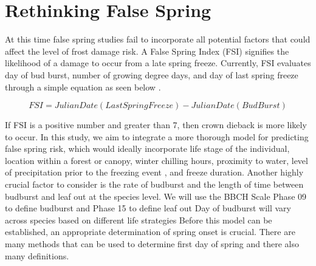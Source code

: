 \documentclass{article}\usepackage[]{graphicx}\usepackage[]{color}
\begin{document}
\section*{Rethinking False Spring}
At this time false spring studies fail to incorporate all potential factors that could affect the level of frost damage risk. A False Spring Index (FSI) signifies the likelihood of a damage to occur from a late spring freeze. Currently, FSI evaluates day of bud burst, number of growing degree days, and day of last spring freeze through a simple equation as seen below \citep{Marino2011}. 

\[ FSI = Julian Date (Last Spring Freeze) - Julian Date (Bud Burst) \]

If FSI is a positive number and greater than 7, then crown dieback is more likely to occur. In this study, we aim to integrate a more thorough model for predicting false spring risk, which would ideally incorporate life stage of the individual, location within a forest or canopy, winter chilling hours, proximity to water, level of precipitation prior to the freezing event \citep{Anderegg2013}
, and freeze duration. Another highly crucial factor to consider is the rate of budburst and the length of time between budburst and leaf out at the species level. We will use the BBCH Scale Phase 09 to define budburst and Phase 15 to define leaf out %
Day of budburst will vary across species based on different life strategies %
Before this model can be established, an appropriate determination of spring onset is crucial. There are many methods that can be used to determine first day of spring and there also many definitions. 
\end{document}
